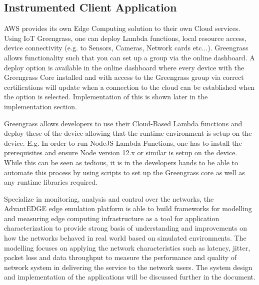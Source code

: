 \subsection{Instrumented Client Application}

AWS provides its own Edge Computing solution to their own Cloud services. Using IoT Greengrass, one can deploy Lambda functions, local resource access, device connectivity (e.g. to Sensors, Cameras, Network cards etc...). Greengrass allows functionality such that you can set up a group via the online dashboard. A deploy option is available in the online dashboard where  every device with the Greengrass Core installed and with access to the Greengrass group via correct certifications will update when a connection to the cloud can be established when the option is selected. Implementation of this is shown later in the implementation section.

Greengrass allows developers to use their Cloud-Based Lambda functions and deploy these of the device allowing that the runtime environment is setup on the device. E.g. In order to run NodeJS Lambda Functions, one has to install the prerequisites and ensure Node version 12.x or similar is setup on the device. While this can be seen as tedious, it is in the developers hands to be able to automate this process by using scripts to set up the Greengrass core as well as any runtime libraries required.

Specialize in monitoring, analysis and control over the networks, the AdvantEDGE edge emulation platform is able to build frameworks for modelling and measuring edge computing infrastructure as a tool for application characterization to provide strong basis of understanding and improvements on how the networks behaved in real world based on simulated environments. The modelling focuses on applying the network characteristics such as latency, jitter, packet loss and data throughput to measure the performance and quality of network system in delivering the service to the network users. The system design and implementation of the applications will be discussed further in the document.

